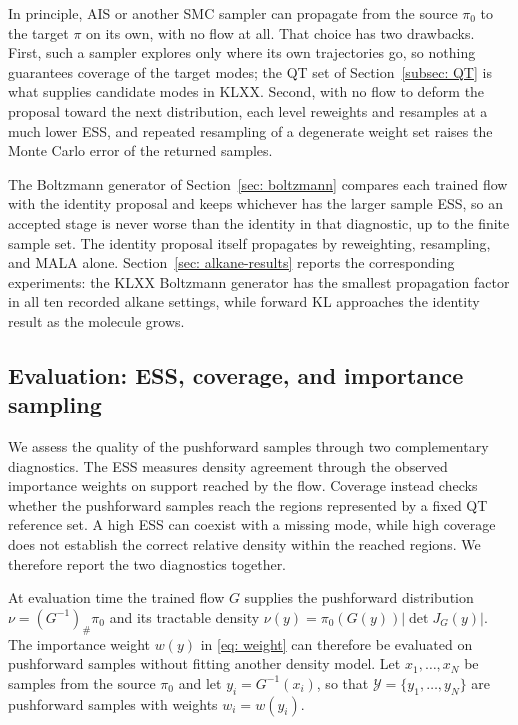 \documentclass{article}
\begin{document}
\begin{remark}
	In principle, AIS or another SMC sampler can propagate from the source $\pi_0$ to the target $\pi$ on its own, with no flow at all. That choice has two drawbacks. First, such a sampler explores only where its own trajectories go, so nothing guarantees coverage of the target modes; the QT set of Section~\ref{subsec: QT} is what supplies candidate modes in KLXX. Second, with no flow to deform the proposal toward the next distribution, each level reweights and resamples at a much lower ESS, and repeated resampling of a degenerate weight set raises the Monte Carlo error of the returned samples.
	
	The Boltzmann generator of Section~\ref{sec: boltzmann} compares each trained flow with the identity proposal and keeps whichever has the larger sample ESS, so an accepted stage is never worse than the identity in that diagnostic, up to the finite sample set. The identity proposal itself propagates by reweighting, resampling, and MALA alone. Section~\ref{sec: alkane-results} reports the corresponding experiments: the KLXX Boltzmann generator has the smallest propagation factor in all ten recorded alkane settings, while forward KL approaches the identity result as the molecule grows.
\end{remark}

\subsection{Evaluation: ESS, coverage, and importance sampling}
\label{subsec: eval}

We assess the quality of the pushforward samples through two complementary diagnostics. The ESS measures density agreement through the observed importance weights on support reached by the flow. Coverage instead checks whether the pushforward samples reach the regions represented by a fixed QT reference set. A high ESS can coexist with a missing mode, while high coverage does not establish the correct relative density within the reached regions. We therefore report the two diagnostics together.

At evaluation time the trained flow $G$ supplies the pushforward distribution $\nu=(G^{-1})_{\#}\pi_0$ and its tractable density $\nu(y)=\pi_0(G(y))|\det J_G(y)|$. The importance weight $w(y)$ in \eqref{eq: weight} can therefore be evaluated on pushforward samples without fitting another density model. Let $x_1,\dots,x_N$ be samples from the source $\pi_0$ and let $y_i = G^{-1}(x_i)$, so that $\mathcal Y=\{y_1,\dots,y_N\}$ are pushforward samples with weights $w_i=w(y_i)$.
\end{document}
